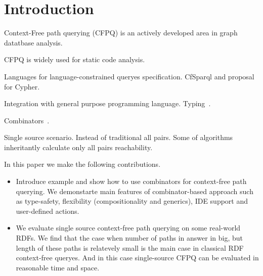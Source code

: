 \section{Introduction}

Context-Free path querying (CFPQ) is an actively developed area in graph datatbase analysis.

CFPQ is widely used for static code analysis.

Languages for language-constrained queryes specification.
CfSparql and proposal for Cypher.

Integration with general purpose programming language. Typing~\cite{10.1145/2076623.2076653}.

Combinators~\cite{10.1145/3241653.3241655}.

Single source scenario.
Instead of traditional all pairs.
Some of algorithms inheritantly calculate only all pairs reachability.

In this paper we make the following contributions.
\begin{itemize}
  \item Introduce example and show how to use combinators for context-free path querying.
  We demonstarte main features of combinator-based approach such as type-safety, flexibility (compositionality and generics), IDE support and user-defined actions.
  \item We evaluate single source context-free path querying on some real-world RDFs.
  We find that the case when number of paths in answer in big, but length of these paths is relatevely small is the main case in classical RDF context-free queryes.
  And in this case single-source CFPQ can be evaluated in reasonable time and space.
\end{itemize}
